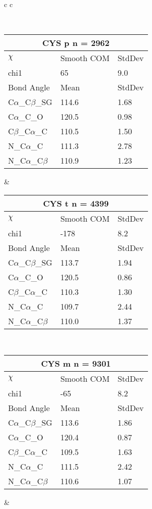 \begin{longtable}{ c c }

\caption{CYS Central Values}\\
  \begin{tabular}{ l l l }
  \toprule
  \multicolumn{3}{c}{CYS \textbf{p} n = 2962} \\ \toprule
  $\chi$       & Smooth COM & StdDev \\ \midrule
  chi1 & 65 & 9.0 \\ \midrule
  Bond Angle   & Mean     & StdDev \\ \midrule
  C$\alpha$\_C$\beta$\_SG & 114.6 & 1.68\\
  C$\alpha$\_C\_O & 120.5 & 0.98\\
  C$\beta$\_C$\alpha$\_C & 110.5 & 1.50\\
  N\_C$\alpha$\_C & 111.3 & 2.78\\
  N\_C$\alpha$\_C$\beta$ & 110.9 & 1.23\\
  \bottomrule
  \end{tabular}
  &
  \begin{tabular}{ l l l }
  \toprule
  \multicolumn{3}{c}{CYS \textbf{t} n = 4399} \\ \toprule
  $\chi$       & Smooth COM & StdDev \\ \midrule
  chi1 & -178 & 8.2 \\ \midrule
  Bond Angle   & Mean     & StdDev \\ \midrule
  C$\alpha$\_C$\beta$\_SG & 113.7 & 1.94\\
  C$\alpha$\_C\_O & 120.5 & 0.86\\
  C$\beta$\_C$\alpha$\_C & 110.3 & 1.30\\
  N\_C$\alpha$\_C & 109.7 & 2.44\\
  N\_C$\alpha$\_C$\beta$ & 110.0 & 1.37\\
  \bottomrule
  \end{tabular}
  \\
  \begin{tabular}{ l l l }
  \toprule
  \multicolumn{3}{c}{CYS \textbf{m} n = 9301} \\ \toprule
  $\chi$       & Smooth COM & StdDev \\ \midrule
  chi1 & -65 & 8.2 \\ \midrule
  Bond Angle   & Mean     & StdDev \\ \midrule
  C$\alpha$\_C$\beta$\_SG & 113.6 & 1.86\\
  C$\alpha$\_C\_O & 120.4 & 0.87\\
  C$\beta$\_C$\alpha$\_C & 109.5 & 1.63\\
  N\_C$\alpha$\_C & 111.5 & 2.42\\
  N\_C$\alpha$\_C$\beta$ & 110.6 & 1.07\\
  \bottomrule
  \end{tabular}
  &
  \\
  
\end{longtable}

